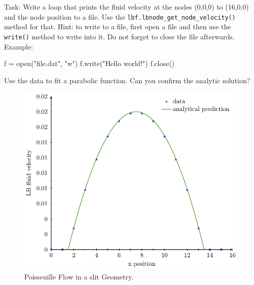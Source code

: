 Task: Write a loop that prints the fluid velocity at the nodes (0,0,0) to (16,0,0)
and the node position to a file. Use the \texttt{lbf.lbnode\_get\_node\_velocity()}
method for that. Hint: to write 
to a file, first open a file and then use the \texttt{write()} method to write 
into it. Do not forget to close the file afterwards. Example:
\vspace{ 0,2cm}
\begin{pypresso}
f = open("file.dat", "w")
f.write("Hello world!\n")
f.close()
\end{pypresso}
\vspace{ 0,2cm}
Use the data to fit a parabolic function. Can you confirm the analytic solution?
\begin{figure}[h]
  \begin{center}
    \includegraphics{figures/poiseuille/poiseuille.pdf}
  \end{center}
  \caption{Poisseuille Flow in a slit Geometry.}
\end{figure}

